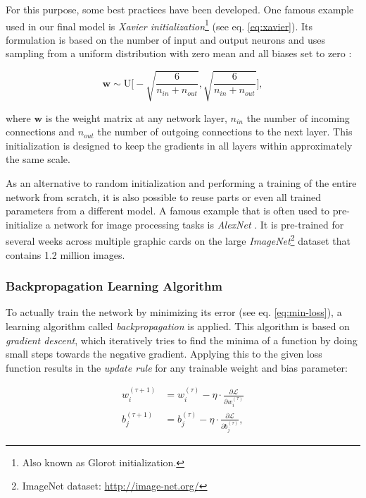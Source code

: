 For this purpose, some best practices have been developed. One famous example used in our final model is \textit{Xavier initialization}\footnote{Also known as Glorot initialization.} (see eq. \ref{eq:xavier}). Its formulation is based on the number of input and output neurons and uses sampling from a uniform distribution with zero mean and all biases set to zero \parencite{xavier-init}:

\begin{equation} \label{eq:xavier}
  \textbf{w} \sim \textrm{U} \bigg[-\sqrt{\frac{6}{n_{in} + n_{out}}}, \sqrt{\frac{6}{n_{in} + n_{out}}}\bigg] ,
\end{equation}

where $ \textbf{w} $ is the weight matrix at any network layer, $ n_{in} $ the number of incoming connections and $ n_{out} $ the number of outgoing connections to the next layer. This initialization is designed to keep the gradients in all layers within approximately the same scale.

As an alternative to random initialization and performing a training of the entire network from scratch, it is also possible to reuse parts or even all trained parameters from a different model. A famous example that is often used to pre-initialize a network for image processing tasks is \textit{AlexNet} \parencite{imagenet}. It is pre-trained for several weeks across multiple graphic cards on the large \textit{ImageNet}\footnote{ImageNet dataset: \url{http://image-net.org/}} dataset that contains 1.2 million images.

\subsubsection{Backpropagation Learning Algorithm}

To actually train the network by minimizing its error (see eq. \ref{eq:min-loss}), a learning algorithm called \textit{backpropagation} is applied. This algorithm is based on \textit{gradient descent}, which iteratively tries to find the minima of a function by doing small steps towards the negative gradient. Applying this to the given loss function results in the \textit{update rule} for any trainable weight and bias parameter:

\begin{equation} \label{eq:gradient_descent}
\begin{aligned}
w_{i}^{(\tau + 1)} &= w_{i}^{(\tau)} - \eta \cdot \frac{\partial \mathcal{L}}{\partial w_{i}^{(\tau)}} \\
b_{j}^{(\tau + 1)} &= b_{j}^{(\tau)} - \eta \cdot \frac{\partial \mathcal{L}}{\partial b_{j}^{(\tau)}} ,
\end{aligned}
\end{equation}

